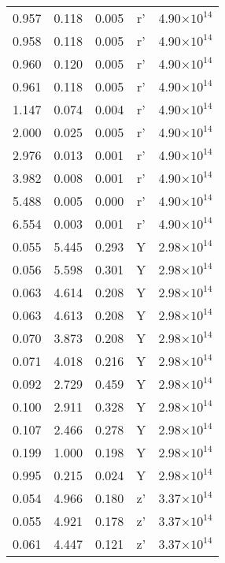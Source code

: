 \documentclass{aa}
\begin{document}
{\begin{longtable}{c|c|c|c|c}
  0.957 &   0.118 &  0.005 & r'        &  4.90$\times 10^{14}$    \\
  0.958 &   0.118 &  0.005 & r'        &  4.90$\times 10^{14}$    \\
  0.960 &   0.120 &  0.005 & r'        &  4.90$\times 10^{14}$    \\
  0.961 &   0.118 &  0.005 & r'        &  4.90$\times 10^{14}$    \\
  1.147 &   0.074 &  0.004 & r'        &  4.90$\times 10^{14}$    \\
  2.000 &   0.025 &  0.005 & r'        &  4.90$\times 10^{14}$    \\
  2.976 &   0.013 &  0.001 & r'        &  4.90$\times 10^{14}$    \\
  3.982 &   0.008 &  0.001 & r'        &  4.90$\times 10^{14}$    \\
  5.488 &   0.005 &  0.000 & r'        &  4.90$\times 10^{14}$    \\
  6.554 &   0.003 &  0.001 & r'        &  4.90$\times 10^{14}$    \\
  0.055 &   5.445 &  0.293 & Y         &  2.98$\times 10^{14}$    \\
  0.056 &   5.598 &  0.301 & Y         &  2.98$\times 10^{14}$    \\
  0.063 &   4.614 &  0.208 & Y         &  2.98$\times 10^{14}$    \\
  0.063 &   4.613 &  0.208 & Y         &  2.98$\times 10^{14}$    \\
  0.070 &   3.873 &  0.208 & Y         &  2.98$\times 10^{14}$    \\
  0.071 &   4.018 &  0.216 & Y         &  2.98$\times 10^{14}$    \\
  0.092 &   2.729 &  0.459 & Y         &  2.98$\times 10^{14}$    \\
  0.100 &   2.911 &  0.328 & Y         &  2.98$\times 10^{14}$    \\
  0.107 &   2.466 &  0.278 & Y         &  2.98$\times 10^{14}$    \\
  0.199 &   1.000 &  0.198 & Y         &  2.98$\times 10^{14}$    \\
  0.995 &   0.215 &  0.024 & Y         &  2.98$\times 10^{14}$    \\
  0.054 &   4.966 &  0.180 & z'        &  3.37$\times 10^{14}$    \\
  0.055 &   4.921 &  0.178 & z'        &  3.37$\times 10^{14}$    \\
  0.061 &   4.447 &  0.121 & z'        &  3.37$\times 10^{14}$    \\

\end{longtable}}
\end{document}
